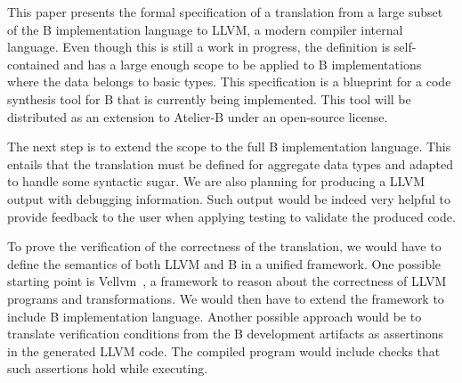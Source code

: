 \documentclass{llncs}
\begin{document}
This paper presents the formal specification of a translation from a large
subset of the B implementation language to LLVM, a modern compiler internal
language.  Even though this is still a work in progress, the definition is
self-contained and has a large enough scope to be applied to B implementations
where the data belongs to basic types. This specification is a blueprint for a
code synthesis tool for B that is currently being implemented. This tool will be
distributed as an extension to Atelier-B under an open-source license.

The next step is to extend the scope to the full B implementation language. This
entails that the translation must be defined for aggregate data types and
adapted to handle some syntactic sugar. We are also planning for producing a
LLVM output with debugging information. Such output would be indeed very helpful
to provide feedback to the user when applying testing to validate the produced
code.

To prove the verification of the correctness of the translation, we would have
to define the semantics of both LLVM and B in a unified framework. One possible
starting point is Vellvm~\cite{vellvm}, a framework to reason about the
correctness of LLVM programs and transformations. We would then have to extend
the framework to include B implementation language. Another possible approach
would be to translate verification conditions from the B development artifacts
as assertinons in the generated LLVM code. The compiled program would include
checks that such assertions hold while executing.



\end{document}
